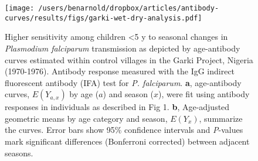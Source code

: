 \documentclass[11pt]{article}
\begin{document}
\begin{figure}[htbp]
\begin{center}
\texttt{[image: /users/benarnold/dropbox/articles/antibody-curves/results/figs/garki-wet-dry-analysis.pdf]}
\begin{minipage}{\textwidth}
\caption{Higher sensitivity among children <5 y to seasonal changes in \textit{Plasmodium falciparum} transmission as depicted by age-antibody curves estimated within control villages in the Garki Project, Nigeria (1970-1976). Antibody response measured with the IgG indirect fluorescent antibody (IFA) test for \textit{P. falciparum}.  \textbf{a}, age-antibody curves, $E(Y_{a,x})$ by age ($a$) and season ($x$), were fit using antibody responses in individuals as described in Fig 1. \textbf{b}, Age-adjusted geometric means by age category and season, $E(Y_x)$, summarize the curves. Error bars show 95\% confidence intervals and \textit{P}-values mark significant differences (Bonferroni corrected) between adjacent seasons.  }
\label{fig:garkiwetdry}
\end{minipage}
\end{center}
\end{figure}
\end{document}
